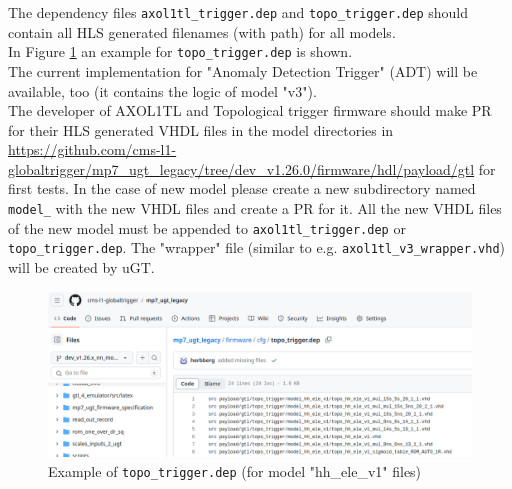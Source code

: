 The dependency files \texttt{axol1tl\_trigger.dep} and \texttt{topo\_trigger.dep} should contain all HLS generated filenames (with path) for all models.\\
In Figure \ref{fig:topo_dep} an example for \texttt{topo\_trigger.dep} is shown.\\

The current implementation for "Anomaly Detection Trigger" (ADT) will be available, too (it contains the logic of model "v3").\\

The developer of AXOL1TL and Topological trigger firmware should make PR for their HLS generated VHDL files in the model directories in \url{https://github.com/cms-l1-globaltrigger/mp7_ugt_legacy/tree/dev_v1.26.0/firmware/hdl/payload/gtl} for first tests. In the case of new model please create a new subdirectory named \texttt{model\_<new model name>} with the new VHDL files and create a PR for it. All the new VHDL files of the new model must be appended to \texttt{axol1tl\_trigger.dep} or \texttt{topo\_trigger.dep}. The "wrapper" file (similar to e.g. \texttt{axol1tl\_v3\_wrapper.vhd}) will be created by uGT.\\

\begin{figure}[htb]
\centering
\includegraphics[width=15cm]{figures/topo_dep}
\caption{Example of \texttt{topo\_trigger.dep} (for model "hh\_ele\_v1" files)}
\label{fig:topo_dep}
\end{figure}
